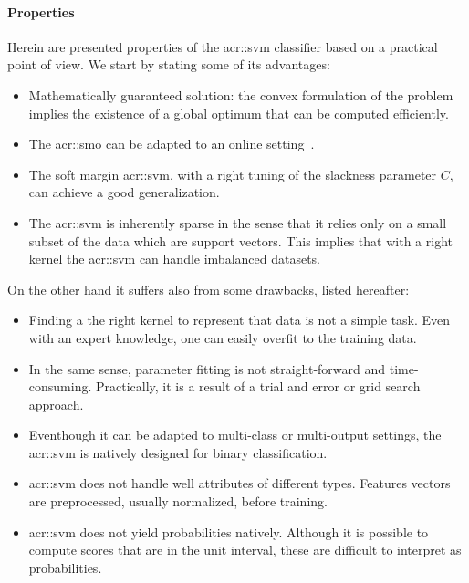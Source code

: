             \paragraph{Properties}
                Herein are presented properties of the \gls{acr::svm} classifier based on a practical point of view.
                We start by stating some of its advantages:
                \begin{itemize}
                    \item Mathematically guaranteed solution: the convex formulation of the problem implies the existence of a global optimum that can be computed efficiently.
                    \item The \gls{acr::smo} can be adapted to an online setting~\parencite{bordes2005fast}.
                    \item The soft margin \gls{acr::svm}, with a right tuning of the slackness parameter $C$, can achieve a good generalization.
                    \item The \gls{acr::svm} is inherently sparse in the sense that it relies only on a small subset of the data which are support vectors.
                            This implies that with a right kernel the \gls{acr::svm} can handle imbalanced datasets.
                \end{itemize}
                On the other hand it suffers also from some drawbacks, listed hereafter:
                \begin{itemize}
                    \item Finding a the right kernel to represent that data is not a simple task.
                            Even with an expert knowledge, one can easily overfit to the training data.
                    \item In the same sense, parameter fitting is not straight-forward and time-consuming.
                            Practically, it is a result of a trial and error or grid search approach.
                    \item Eventhough it can be adapted to multi-class or multi-output settings, the \gls{acr::svm} is natively designed for binary classification.
                    \item \gls{acr::svm} does not handle well attributes of different types.
                            Features vectors are preprocessed, usually normalized, before training.
                    \item \gls{acr::svm} does not yield probabilities natively.
                            Although it is possible to compute scores that are in the unit interval, these are difficult to interpret as probabilities.
                \end{itemize}

